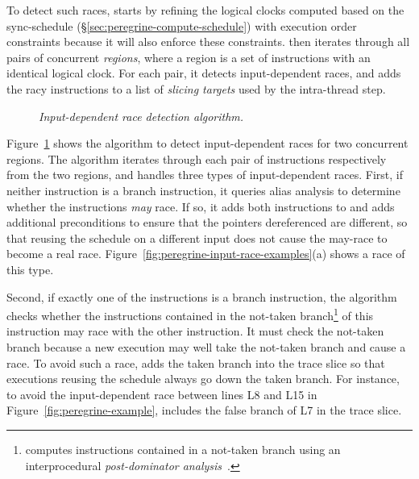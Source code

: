 To detect such races, \peregrine starts by refining the logical clocks computed
based on the sync-schedule (\S\ref{sec:peregrine-compute-schedule}) with
execution order constraints because it will also enforce these
constraints.  \peregrine then iterates through all pairs
of concurrent \emph{regions}, where a region is a set of instructions with an identical
logical clock.  For each pair, it detects input-dependent races, and adds
the racy instructions to a list of \emph{slicing targets} used by the
intra-thread step.

\begin{figure}[t]
\centering
\begin{minipage}[t]{.5\textwidth}
\end{minipage}
\vspace{-.2in}
\caption{{\em Input-dependent race detection
    algorithm.}} \label{fig:peregrine-detect-input-race}
\vspace{-.1in}
\end{figure}

Figure~\ref{fig:peregrine-detect-input-race} shows the algorithm to detect
input-dependent races for two concurrent regions.  The algorithm iterates
through each pair of instructions respectively from the
two regions, and handles three types of input-dependent races.  First, if
neither instruction is a branch instruction, it queries alias analysis to
determine whether the instructions \emph{may} race.  If so, it adds both
instructions to  and adds additional
preconditions to ensure that the pointers dereferenced are different, so
that reusing the schedule on a different input does not cause the may-race
to become a real race.  Figure~\ref{fig:peregrine-input-race-examples}(a) shows
a race of this type.

Second, if exactly one of the instructions is a branch instruction, the
algorithm checks whether the instructions contained in the not-taken
branch\footnote{\peregrine computes instructions contained in a not-taken
  branch using an interprocedural \emph{post-dominator
    analysis}~\cite{aho:dragon:06}.} of this instruction may race with the
other instruction.
It must check the not-taken branch because a new
execution may well take the not-taken branch and cause a race.  To avoid such a
race, \peregrine adds the taken branch into the trace slice so that executions
reusing the schedule always go down the taken branch.  For instance, to
avoid the input-dependent race between lines L8 and L15
in Figure~\ref{fig:peregrine-example}, \peregrine includes
the false branch of L7 in the trace slice.

